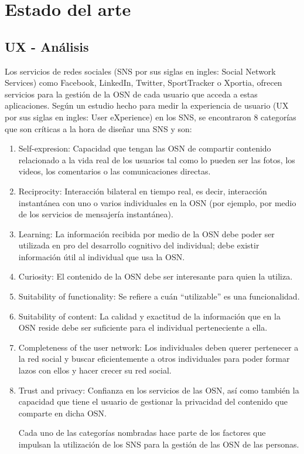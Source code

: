 \section{Estado del arte} \label{cap:estado_arte}
\subsection{UX - Análisis}
Los servicios de redes sociales (SNS por sus siglas en ingles: Social Network Services) como Facebook, LinkedIn, Twitter, SportTracker o Xportia, ofrecen servicios para la gestión de la OSN de cada usuario que acceda a estas aplicaciones. Según un estudio hecho para medir la experiencia de usuario (UX por sus siglas en ingles: User eXperience) en los SNS, se encontraron 8 categorías que son críticas a la hora de diseñar una SNS y son:

\begin{enumerate}
  \item Self-expresion: Capacidad que tengan las OSN de compartir contenido relacionado a la vida real de los usuarios tal como lo pueden ser las fotos, los videos, los comentarios o las comunicaciones directas.
  \item Reciprocity: Interacción bilateral en tiempo real, es decir, interacción instantánea con uno o varios individuales en la OSN (por ejemplo, por medio de los servicios de mensajería instantánea).
  \item Learning: La información recibida por medio de la OSN debe poder ser utilizada en pro del desarrollo cognitivo del individual; debe existir información útil al individual que usa la OSN.
  \item Curiosity: El contenido de la OSN debe ser interesante para quien la utiliza.
  \item Suitability of functionality: Se refiere a cuán ``utilizable'' es una funcionalidad.
  \item Suitability of content: La calidad y exactitud de la información que en la OSN reside debe ser suficiente para el individual perteneciente a ella.
  \item Completeness of the user network: Los individuales deben querer pertenecer a la red social y buscar eficientemente a otros individuales para poder formar lazos con ellos y hacer crecer su red social.
  \item Trust and privacy: Confianza en los servicios de las OSN, así como también la capacidad que tiene el usuario de gestionar la privacidad del contenido que comparte en dicha OSN. \cite{social_experience}

Cada uno de las categorías nombradas hace parte de los factores que impulsan la utilización de los SNS para la gestión de las OSN de las personas. 
\end{enumerate}

